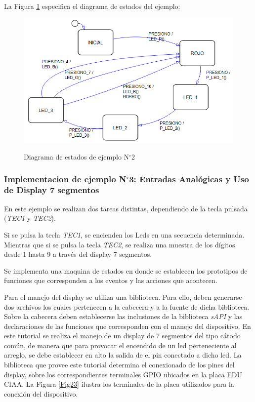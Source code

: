 \documentclass[12pt,letterpaper]{article}
\begin{document}
La Figura \ref{Fig22} especifica el diagrama de estados del ejemplo:
\begin{center}
\begin{figure}[!h]
\centering
\includegraphics[width=7 cm]{figuras/f4.png}\\
\caption{Diagrama de estados de ejemplo N$^{\circ}$2}
\label{Fig22}
\end{figure}
\end{center}
\subsubsection{Implementacion de ejemplo N$^{\circ}$3: Entradas Analógicas y Uso de Display 7 segmentos}
En este ejemplo se realizan dos tareas distintas, dependiendo de la tecla pulsada (\textit{TEC1} y \textit{TEC2}).

Si se pulsa la tecla \textit{TEC1}, se encienden los Leds en una secuencia determinada. Mientras que si se pulsa la tecla \textit{TEC2}, se realiza una muestra de los dígitos desde 1 hasta 9 a través del display 7 segmentos. 

Se implementa una maquina de estados en donde se establecen los prototipos de funciones que corresponden a los eventos y las acciones que acontecen. 

Para el manejo del display se utiliza una biblioteca. Para ello, deben generarse dos archivos los cuales pertenecen a la cabecera y a la fuente de dicha biblioteca. Sobre la cabecera deben establecerse las inclusiones de la biblioteca \textit{sAPI} y las declaraciones de las funciones que corresponden con el manejo del dispositivo. En este tutorial se realiza el manejo de un display de 7 segmentos del tipo cátodo común, de manera que para provocar el encendido de un led perteneciente al arreglo, se debe establecer en alto la salida de el pin conectado a dicho led. La biblioteca que provee este tutorial determina el conexionado de los pines del display, sobre los correspondientes terminales GPIO ubicados en la placa EDU CIAA. La Figura \ref{Fig23} ilustra los terminales de la placa utilizados para la conexión del dispositivo.
\end{document}
